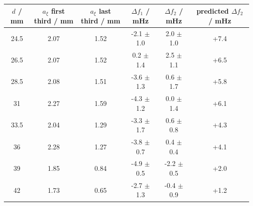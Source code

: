 \begin{tabular}{@{}cccccc@{}}
\toprule
$d$ / mm & $a_\xi$ first third / mm & $a_\xi$ last third / mm & $\Delta f_1$ / mHz & $\Delta f_2$ / mHz & predicted $\Delta f_2$ / mHz \\
\midrule
24.5 & 2.07 & 1.52 & -2.1 $\pm$ 1.0 & 2.0 $\pm$ 1.0 & +7.4 \\
26.5 & 2.07 & 1.52 & 0.2 $\pm$ 1.4 & 2.5 $\pm$ 1.1 & +6.5 \\
28.5 & 2.08 & 1.51 & -3.6 $\pm$ 1.3 & 0.6 $\pm$ 1.7 & +5.8 \\
31 & 2.27 & 1.59 & -4.3 $\pm$ 1.2 & 0.0 $\pm$ 1.4 & +6.1 \\
33.5 & 2.04 & 1.29 & -3.3 $\pm$ 1.7 & 0.6 $\pm$ 0.8 & +4.3 \\
36 & 2.28 & 1.27 & -3.8 $\pm$ 0.7 & 0.4 $\pm$ 0.4 & +4.1 \\
39 & 1.85 & 0.84 & -4.9 $\pm$ 0.5 & -2.2 $\pm$ 0.5 & +2.0 \\
42 & 1.73 & 0.65 & -2.7 $\pm$ 1.3 & -0.4 $\pm$ 0.9 & +1.2 \\
\bottomrule
\end{tabular}